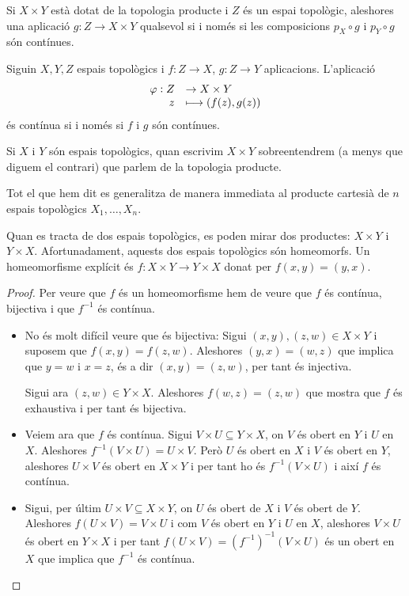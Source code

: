 \documentclass[../main.tex]{subfiles}
\begin{document}
\begin{prop}
\label{prop:topoproducte2} Si $X\times Y$ està dotat de la topologia producte i $Z$ és un espai topològic, aleshores una aplicació $g:Z\rightarrow X\times Y$ qualsevol si i només si les composicions $p_X\circ g$ i $p_Y\circ g$ són contínues.
\end{prop}

\begin{prop}
\label{prop:topoproducte3} Siguin $X,Y,Z$ espais topològics i $f:Z\rightarrow X$, $g:Z\rightarrow Y$ aplicacions. L'aplicació 
\begin{equation}
    \notag
    \begin{array}{rl}
        \varphi:Z & \rightarrow X\times Y \\
        z & \longmapsto (f(z),g(z))
    \end{array}
\end{equation}
és contínua si i només si $f$ i $g$ són contínues.
\end{prop}

Si $X$ i $Y$ són espais topològics, quan escrivim $X\times Y$ sobreentendrem (a menys que diguem el contrari) que parlem de la topologia producte.

Tot el que hem dit es generalitza de manera immediata al producte cartesià de $n$ espais topològics $X_1,\ldots,X_n$.

\begin{prop}
\label{prop:topoproducte4} Quan es tracta de dos espais topològics, es poden mirar dos productes: $X\times Y$ i $Y\times X$. Afortunadament, aquests dos espais topològics són homeomorfs. Un homeomorfisme explícit és $f:X\times Y\rightarrow Y\times X$ donat per $f(x,y) = (y,x)$.
\end{prop}
\begin{proof}
Per veure que $f$ és un homeomorfisme hem de veure que $f$ és contínua, bijectiva i que $f^{-1}$ és contínua.
\begin{itemize}
    \item No és molt difícil veure que és bijectiva: Sigui $(x,y),(z,w)\in X\times Y$ i suposem que $f(x,y) = f(z,w)$. Aleshores $(y,x) = (w,z)$ que implica que $y = w$ i $x = z$, és a dir $(x,y) = (z,w)$, per tant és injectiva.
    
    Sigui ara $(z,w)\in Y\times X$. Aleshores $f(w,z) = (z,w)$ que mostra que $f$ és exhaustiva i per tant és bijectiva.
    \item Veiem ara que $f$ és contínua. Sigui $V\times U\subseteq Y\times X$, on $V$ és obert en $Y$ i $U$ en $X$. Aleshores $f^{-1}(V\times U) = U\times V$. Però $U$ és obert en $X$ i $V$ és obert en $Y$, aleshores $U\times V$ és obert en $X\times Y$ i per tant ho és $f^{-1}(V\times U)$ i així $f$ és contínua.
    \item Sigui, per últim $U\times V\subseteq X\times Y$, on $U$ és obert de $X$ i $V$ és obert de $Y$. Aleshores $f(U\times V) = V\times U$ i com $V$ és obert en $Y$ i $U$ en $X$, aleshores $V\times U$ és obert en $Y\times X$ i per tant $f(U\times V) = (f^{-1})^{-1}(V\times U)$ és un obert en $X$ que implica que $f^{-1}$ és contínua.
\end{itemize}
\end{proof}
\end{document}
